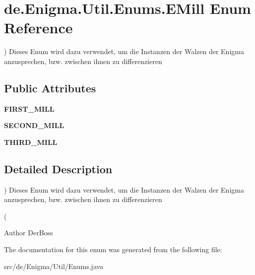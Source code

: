 \hypertarget{enumde_1_1_enigma_1_1_util_1_1_enums_1_1_e_mill}{}\section{de.\+Enigma.\+Util.\+Enums.\+E\+Mill Enum Reference}
\label{enumde_1_1_enigma_1_1_util_1_1_enums_1_1_e_mill}


) Dieses Enum wird dazu verwendet, um die Instanzen der Walzen der Enigma anzusprechen, bzw. zwischen ihnen zu differenzieren  


\subsection*{Public Attributes}
\begin{DoxyCompactItemize}
\item 
\mbox{\label{enumde_1_1_enigma_1_1_util_1_1_enums_1_1_e_mill_a1fe7c36a499e336421fff6bbfbdc2d1f}} 
{\bfseries F\+I\+R\+S\+T\+\_\+\+M\+I\+LL}
\item 
\mbox{\label{enumde_1_1_enigma_1_1_util_1_1_enums_1_1_e_mill_a5efd3b3ec74667db7d6b28bd8c02a9a9}} 
{\bfseries S\+E\+C\+O\+N\+D\+\_\+\+M\+I\+LL}
\item 
\mbox{\label{enumde_1_1_enigma_1_1_util_1_1_enums_1_1_e_mill_ad80ebf2e777a7badefe1de9b4f267f69}} 
{\bfseries T\+H\+I\+R\+D\+\_\+\+M\+I\+LL}
\end{DoxyCompactItemize}


\subsection{Detailed Description}
) Dieses Enum wird dazu verwendet, um die Instanzen der Walzen der Enigma anzusprechen, bzw. zwischen ihnen zu differenzieren 

(\begin{DoxyAuthor}{Author}
Der\+Boss 
\end{DoxyAuthor}


The documentation for this enum was generated from the following file\+:\begin{DoxyCompactItemize}
\item 
src/de/\+Enigma/\+Util/Enums.\+java\end{DoxyCompactItemize}
